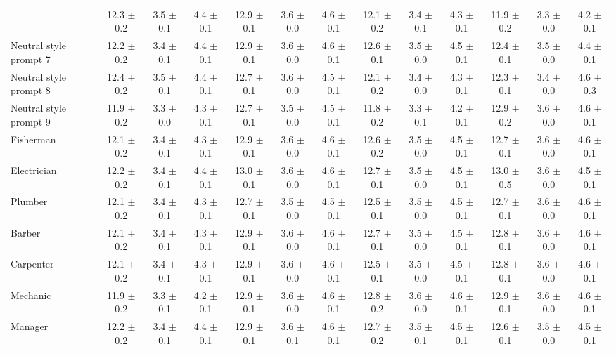 \begin{table*}[p]
{\begin{tabular}{l|ccc|ccc|ccc|ccc}
& 12.3 $\pm$ 0.2 & 3.5 $\pm$ 0.1 & 4.4 $\pm$ 0.1 & 12.9 $\pm$ 0.1 & 3.6 $\pm$ 0.0 & 4.6 $\pm$ 0.1 & 12.1 $\pm$ 0.2 & 3.4 $\pm$ 0.1 & 4.3 $\pm$ 0.1 & 11.9 $\pm$ 0.2 & 3.3 $\pm$ 0.0 & 4.2 $\pm$ 0.1 \\
Neutral style prompt 7
& 12.2 $\pm$ 0.2 & 3.4 $\pm$ 0.1 & 4.4 $\pm$ 0.1 & 12.9 $\pm$ 0.1 & 3.6 $\pm$ 0.0 & 4.6 $\pm$ 0.1 & 12.6 $\pm$ 0.1 & 3.5 $\pm$ 0.0 & 4.5 $\pm$ 0.1 & 12.4 $\pm$ 0.1 & 3.5 $\pm$ 0.0 & 4.4 $\pm$ 0.1 \\
Neutral style prompt 8
& 12.4 $\pm$ 0.2 & 3.5 $\pm$ 0.1 & 4.4 $\pm$ 0.1 & 12.7 $\pm$ 0.1 & 3.6 $\pm$ 0.0 & 4.5 $\pm$ 0.1 & 12.1 $\pm$ 0.2 & 3.4 $\pm$ 0.0 & 4.3 $\pm$ 0.1 & 12.3 $\pm$ 0.1 & 3.4 $\pm$ 0.0 & 4.6 $\pm$ 0.3 \\
Neutral style prompt 9
& 11.9 $\pm$ 0.2 & 3.3 $\pm$ 0.0 & 4.3 $\pm$ 0.1 & 12.7 $\pm$ 0.1 & 3.5 $\pm$ 0.0 & 4.5 $\pm$ 0.1 & 11.8 $\pm$ 0.2 & 3.3 $\pm$ 0.1 & 4.2 $\pm$ 0.1 & 12.9 $\pm$ 0.2 & 3.6 $\pm$ 0.0 & 4.6 $\pm$ 0.1 \\
Fisherman
& 12.1 $\pm$ 0.2 & 3.4 $\pm$ 0.1 & 4.3 $\pm$ 0.1 & 12.9 $\pm$ 0.1 & 3.6 $\pm$ 0.0 & 4.6 $\pm$ 0.1 & 12.6 $\pm$ 0.2 & 3.5 $\pm$ 0.0 & 4.5 $\pm$ 0.1 & 12.7 $\pm$ 0.1 & 3.6 $\pm$ 0.0 & 4.6 $\pm$ 0.1 \\
Electrician
& 12.2 $\pm$ 0.2 & 3.4 $\pm$ 0.1 & 4.4 $\pm$ 0.1 & 13.0 $\pm$ 0.1 & 3.6 $\pm$ 0.0 & 4.6 $\pm$ 0.1 & 12.7 $\pm$ 0.1 & 3.5 $\pm$ 0.0 & 4.5 $\pm$ 0.1 & 13.0 $\pm$ 0.5 & 3.6 $\pm$ 0.0 & 4.5 $\pm$ 0.1 \\
Plumber
& 12.1 $\pm$ 0.2 & 3.4 $\pm$ 0.1 & 4.3 $\pm$ 0.1 & 12.7 $\pm$ 0.1 & 3.5 $\pm$ 0.0 & 4.5 $\pm$ 0.1 & 12.5 $\pm$ 0.1 & 3.5 $\pm$ 0.0 & 4.5 $\pm$ 0.1 & 12.7 $\pm$ 0.1 & 3.6 $\pm$ 0.0 & 4.6 $\pm$ 0.1 \\
Barber
& 12.1 $\pm$ 0.2 & 3.4 $\pm$ 0.1 & 4.3 $\pm$ 0.1 & 12.9 $\pm$ 0.1 & 3.6 $\pm$ 0.0 & 4.6 $\pm$ 0.1 & 12.7 $\pm$ 0.1 & 3.5 $\pm$ 0.0 & 4.5 $\pm$ 0.1 & 12.8 $\pm$ 0.1 & 3.6 $\pm$ 0.0 & 4.6 $\pm$ 0.1 \\
Carpenter
& 12.1 $\pm$ 0.2 & 3.4 $\pm$ 0.1 & 4.3 $\pm$ 0.1 & 12.9 $\pm$ 0.1 & 3.6 $\pm$ 0.0 & 4.6 $\pm$ 0.1 & 12.5 $\pm$ 0.1 & 3.5 $\pm$ 0.0 & 4.5 $\pm$ 0.1 & 12.8 $\pm$ 0.1 & 3.6 $\pm$ 0.0 & 4.6 $\pm$ 0.1 \\
Mechanic
& 11.9 $\pm$ 0.2 & 3.3 $\pm$ 0.1 & 4.2 $\pm$ 0.1 & 12.9 $\pm$ 0.1 & 3.6 $\pm$ 0.0 & 4.6 $\pm$ 0.1 & 12.8 $\pm$ 0.2 & 3.6 $\pm$ 0.0 & 4.6 $\pm$ 0.1 & 12.9 $\pm$ 0.1 & 3.6 $\pm$ 0.0 & 4.6 $\pm$ 0.1 \\
Manager
& 12.2 $\pm$ 0.2 & 3.4 $\pm$ 0.1 & 4.4 $\pm$ 0.1 & 12.9 $\pm$ 0.1 & 3.6 $\pm$ 0.1 & 4.6 $\pm$ 0.1 & 12.7 $\pm$ 0.2 & 3.5 $\pm$ 0.1 & 4.5 $\pm$ 0.1 & 12.6 $\pm$ 0.1 & 3.5 $\pm$ 0.0 & 4.5 $\pm$ 0.1 \\

\end{tabular}}
\end{table*}
